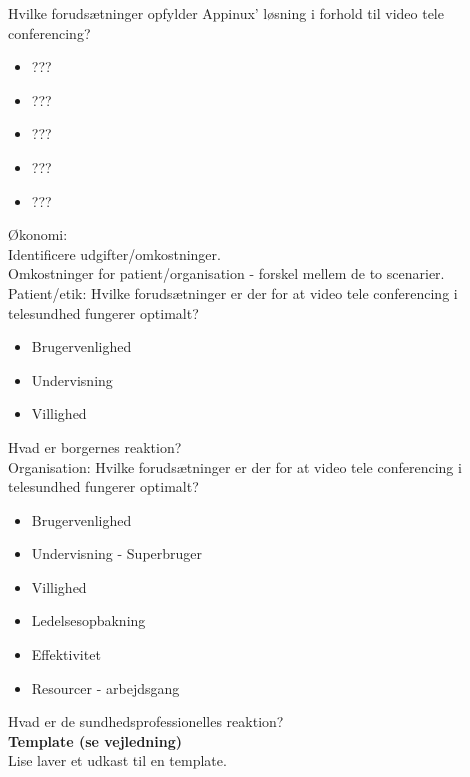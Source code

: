 Hvilke forudsætninger opfylder Appinux' løsning i forhold til video tele conferencing?
\begin{itemize}
	\item ???
	\item ???
	\item ???
	\item ???
	\item ???
\end{itemize}


Økonomi: \\
Identificere udgifter/omkostninger.\\
Omkostninger for patient/organisation - forskel mellem de to scenarier.
\\

Patient/etik:
Hvilke forudsætninger er der for at video tele conferencing i  telesundhed fungerer optimalt?\\
\begin{itemize}
	\item Brugervenlighed
	\item Undervisning
	\item Villighed
\end{itemize}

Hvad er borgernes reaktion?\\

Organisation:
Hvilke forudsætninger er der for at video tele conferencing i  telesundhed fungerer optimalt?\\
\begin{itemize}
	\item Brugervenlighed
	\item Undervisning - Superbruger
	\item Villighed
	\item Ledelsesopbakning
	\item Effektivitet
	\item Resourcer - arbejdsgang
\end{itemize}

Hvad er de sundhedsprofessionelles reaktion?\\

\textbf{Template (se vejledning)}
\\
Lise laver et udkast til en template.
